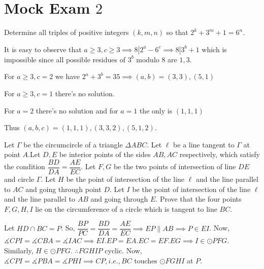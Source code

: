 \documentclass{subfile}
\begin{document}
		
		\section{Mock Exam $2$}
		
		\begin{problem}
			Determine all triples of positive integers $(k,m,n)$ so that $2^k+3^m+1=6^n$.
		\end{problem}
		
		\begin{solution}
		    It is easy to observe that $a \ge 3,c \ge 3 \implies 8|2^a-6^c \implies 8|3^b+1$ which is impossible since all possible residues of $3^b$ modulo $8$ are $1,3$.

            For $a \ge 3,c=2$ we have
            $2^a+3^b=35 \implies (a,b)=(3,3),(5,1)$
            
            For $a \ge 3,c=1$ there's no solution.
            
            For $a=2$ there's no solution and for $a=1$ the only is $(1,1,1)$
            
            Thus $(a,b,c)=(1,1,1),(3,3,2),(5,1,2)$.
		\end{solution}
		
		\begin{problem}
			Let $\Gamma$ be the circumcircle of a triangle $\Delta ABC$. Let $\ell$ be a line tangent to $\Gamma$ at point $A$.Let $D, E$ be interior points of the sides $AB, AC$ respectively, which satisfy the condition $\dfrac{BD}{DA}=\dfrac{AE}{EC}$. Let $F, G$ be the two points of intersection of line $DE$ and circle $\Gamma$. Let $H$ be the	point of intersection of the line $\ell$ and the line parallel to $AC$ and going through point $D$. Let $I$ be the point of intersection of the line $\ell$ and the line parallel to $AB$ and going through $E$.
			Prove that the four points $F, G, H, I$ lie on the circumference of a circle which is tangent to line $BC$.
		\end{problem}
		
		\begin{solution}
		    Let $HD \cap BC = P$. So, $\dfrac{BP}{PC}=\dfrac{BD}{DA}=\dfrac{AE}{EC} \implies EP \parallel AB \implies P \in EI$.
            Now, $\measuredangle CPI = \measuredangle CBA = \measuredangle IAC \implies EI.EP = EA.EC = EF.EG \implies I \in \odot PFG$. Similarly, $H \in \odot PFG$.
            $\therefore FGHIP$ cyclic. Now, $\measuredangle CPI = \measuredangle PBA = \measuredangle PHI \implies CP, i.e., BC$ touches $\odot FGHI$ at $P$.
		\end{solution}
		
\end{document}
